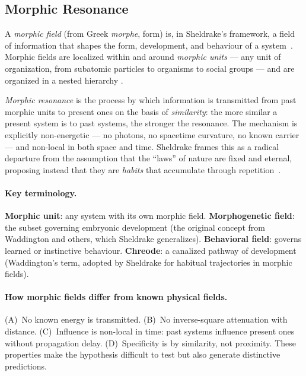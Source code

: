 \documentclass[twoside,11pt]{article}
\begin{document}
\subsection{Morphic Resonance}
\label{sec:background:morphic}

A \emph{morphic field} (from Greek \emph{morphe}, form) is, in Sheldrake's
framework, a field of information that shapes the form, development, and
behaviour of a system~\citep{sheldrake1981}.  Morphic fields are localized
within and around \emph{morphic units} --- any unit of organization, from
subatomic particles to organisms to social groups --- and are organized in a
nested hierarchy \citep[a \emph{holarchy}, per][]{koestler1967}.

\emph{Morphic resonance} is the process by which information is transmitted
from past morphic units to present ones on the basis of \emph{similarity}: the
more similar a present system is to past systems, the stronger the resonance.
The mechanism is explicitly non-energetic --- no photons, no spacetime
curvature, no known carrier --- and non-local in both space and time.
Sheldrake frames this as a radical departure from the assumption that the
``laws'' of nature are fixed and eternal, proposing instead that they are
\emph{habits} that accumulate through repetition~\citep{sheldrake1988}.

\paragraph{Key terminology.}
\textbf{Morphic unit}: any system with its own morphic field.
\textbf{Morphogenetic field}: the subset governing embryonic development
(the original concept from Waddington and others, which Sheldrake
generalizes).  \textbf{Behavioral field}: governs learned or instinctive
behaviour.  \textbf{Chreode}: a canalized pathway of development
(Waddington's term, adopted by Sheldrake for habitual trajectories in morphic
fields).

\paragraph{How morphic fields differ from known physical fields.}
(A)~No known energy is transmitted.  (B)~No inverse-square attenuation with
distance.  (C)~Influence is non-local in time: past systems influence present
ones without propagation delay.  (D)~Specificity is by similarity, not
proximity.  These properties make the hypothesis difficult to test but also
generate distinctive predictions.
\end{document}
